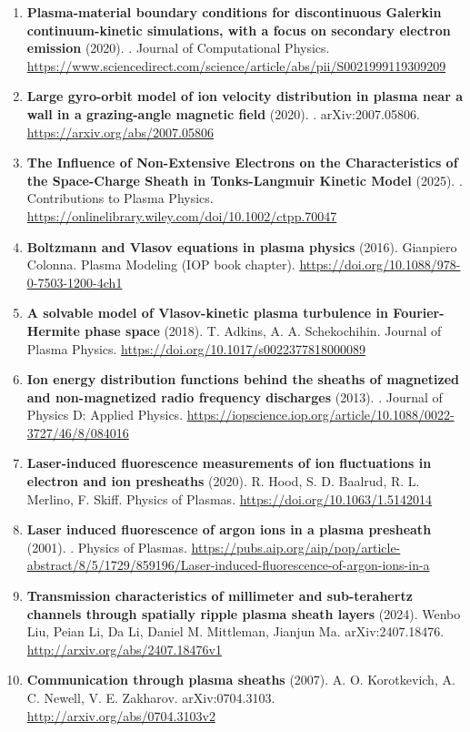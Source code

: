 \documentclass[11pt,a4paper]{article}
\begin{document}
\begin{enumerate}[leftmargin=1.4em]
\item \textbf{Plasma-material boundary conditions for discontinuous Galerkin continuum-kinetic simulations, with a focus on secondary electron emission} (2020). . Journal of Computational Physics. \url{https://www.sciencedirect.com/science/article/abs/pii/S0021999119309209}
\item \textbf{Large gyro-orbit model of ion velocity distribution in plasma near a wall in a grazing-angle magnetic field} (2020). . arXiv:2007.05806. \url{https://arxiv.org/abs/2007.05806}
\item \textbf{The Influence of Non-Extensive Electrons on the Characteristics of the Space-Charge Sheath in Tonks-Langmuir Kinetic Model} (2025). . Contributions to Plasma Physics. \url{https://onlinelibrary.wiley.com/doi/10.1002/ctpp.70047}
\item \textbf{Boltzmann and Vlasov equations in plasma physics} (2016). Gianpiero Colonna. Plasma Modeling (IOP book chapter). \url{https://doi.org/10.1088/978-0-7503-1200-4ch1}
\item \textbf{A solvable model of Vlasov-kinetic plasma turbulence in Fourier-Hermite phase space} (2018). T. Adkins, A. A. Schekochihin. Journal of Plasma Physics. \url{https://doi.org/10.1017/s0022377818000089}
\item \textbf{Ion energy distribution functions behind the sheaths of magnetized and non-magnetized radio frequency discharges} (2013). . Journal of Physics D: Applied Physics. \url{https://iopscience.iop.org/article/10.1088/0022-3727/46/8/084016}
\item \textbf{Laser-induced fluorescence measurements of ion fluctuations in electron and ion presheaths} (2020). R. Hood, S. D. Baalrud, R. L. Merlino, F. Skiff. Physics of Plasmas. \url{https://doi.org/10.1063/1.5142014}
\item \textbf{Laser induced fluorescence of argon ions in a plasma presheath} (2001). . Physics of Plasmas. \url{https://pubs.aip.org/aip/pop/article-abstract/8/5/1729/859196/Laser-induced-fluorescence-of-argon-ions-in-a}
\item \textbf{Transmission characteristics of millimeter and sub-terahertz channels through spatially ripple plasma sheath layers} (2024). Wenbo Liu, Peian Li, Da Li, Daniel M. Mittleman, Jianjun Ma. arXiv:2407.18476. \url{http://arxiv.org/abs/2407.18476v1}
\item \textbf{Communication through plasma sheaths} (2007). A. O. Korotkevich, A. C. Newell, V. E. Zakharov. arXiv:0704.3103. \url{http://arxiv.org/abs/0704.3103v2}
\end{enumerate}
\end{document}
